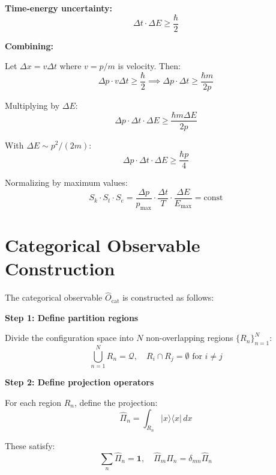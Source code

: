 \documentclass[aps,prl,twocolumn,superscriptaddress,floatfix]{revtex4-2}
\begin{document}
\textbf{Time-energy uncertainty:}
\begin{equation}
\Delta t \cdot \Delta E \geq \frac{\hbar}{2}
\end{equation}

\textbf{Combining:}

Let $\Delta x = v \Delta t$ where $v = p/m$ is velocity. Then:
\begin{equation}
\Delta p \cdot v \Delta t \geq \frac{\hbar}{2} \implies \Delta p \cdot \Delta t \geq \frac{\hbar m}{2p}
\end{equation}

Multiplying by $\Delta E$:
\begin{equation}
\Delta p \cdot \Delta t \cdot \Delta E \geq \frac{\hbar m \Delta E}{2p}
\end{equation}

With $\Delta E \sim p^2/(2m)$:
\begin{equation}
\Delta p \cdot \Delta t \cdot \Delta E \geq \frac{\hbar p}{4}
\end{equation}

Normalizing by maximum values:
\begin{equation}
S_k \cdot S_t \cdot S_e = \frac{\Delta p}{p_{\max}} \cdot \frac{\Delta t}{T} \cdot \frac{\Delta E}{E_{\max}} = \text{const}
\end{equation}

\section{Categorical Observable Construction}

The categorical observable $\hat{O}_{\text{cat}}$ is constructed as follows:

\textbf{Step 1: Define partition regions}

Divide the configuration space into $N$ non-overlapping regions $\{R_n\}_{n=1}^N$:
\begin{equation}
\bigcup_{n=1}^N R_n = \mathcal{Q}, \quad R_i \cap R_j = \emptyset \text{ for } i \neq j
\end{equation}

\textbf{Step 2: Define projection operators}

For each region $R_n$, define the projection:
\begin{equation}
\hat{\Pi}_n = \int_{R_n} |x\rangle\langle x| \, dx
\end{equation}

These satisfy:
\begin{equation}
\sum_n \hat{\Pi}_n = \mathbf{1}, \quad \hat{\Pi}_m \hat{\Pi}_n = \delta_{mn} \hat{\Pi}_n
\end{equation}
\end{document}
